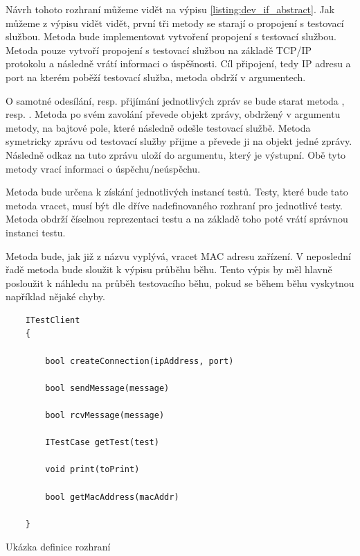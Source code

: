 Návrh tohoto rozhraní můžeme vidět na výpisu \ref{listing:dev_if_abstract}. Jak můžeme z výpisu vidět vidět, první tři metody se starají o propojení s testovací službou. Metoda  bude implementovat vytvoření propojení s testovací službou. Metoda pouze vytvoří propojení s testovací službou na základě TCP/IP protokolu a následně vrátí informaci o úspěšnosti. Cíl připojení, tedy IP adresu a port na kterém poběží testovací služba, metoda obdrží v argumentech.

O samotné odesílání, resp. přijímání jednotlivých zpráv se bude starat metoda , resp. . Metoda  po svém zavolání převede objekt zprávy, obdržený v argumentu metody, na bajtové pole, které následně odešle testovací službě. Metoda  symetricky zprávu od testovací služby přijme a převede ji na objekt jedné zprávy. Následně odkaz na tuto zprávu uloží do argumentu, který je výstupní. Obě tyto metody vrací informaci o úspěchu/neúspěchu.

Metoda  bude určena k získání jednotlivých instancí testů. Testy, které bude tato metoda vracet, musí být dle dříve nadefinovaného rozhraní pro jednotlivé testy. Metoda obdrží číselnou reprezentaci testu a na základě toho poté vrátí správnou instanci testu. 

Metoda  bude, jak již z názvu vyplývá, vracet MAC adresu zařízení. V neposlední řadě metoda  bude sloužit k výpisu průběhu běhu. Tento výpis by měl hlavně posloužit k náhledu na průběh testovacího běhu, pokud se během běhu vyskytnou například nějaké chyby.

\begin{listing}[htbp]
    \begin{verbatim}
    ITestClient 
    {

        bool createConnection(ipAddress, port)

        bool sendMessage(message)

        bool rcvMessage(message)

        ITestCase getTest(test)

        void print(toPrint)

        bool getMacAddress(macAddr)
    
    }
    \end{verbatim}
\caption{Ukázka definice rozhraní}
\label{listing:dev_if_abstract}
\end{listing}


